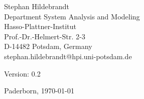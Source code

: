\documentclass[12pt,a4paper,twoside,titlepage,openright,headsepline,listof=totoc,index=totoc,chapterprefix,bibliography=totoc,noenddot,%
numbers=noenddot, %
]{scrreprt}
\theoremstyle{break}
\begin{document}
\begin{titlepage}
{            \vspace{1cm}

			Stephan Hildebrandt\\
			Department System Analysis and Modeling\\
			Hasso-Plattner-Institut\\
			Prof.-Dr.-Helmert-Str. 2-3\\
			D-14482 Potsdam, Germany\\
			stephan.hildebrandt@hpi.uni-potsdam.de\\

            \vspace{1.5cm}

            Version: 0.2

			\vspace{1.5cm}
			Paderborn, \today

		}
	\end{titlepage}


	
%
	
%	
        
% 	

% 	
	
	\tableofcontents
	\listoftodos
	\cleardoublepage
% 


	\setcounter{page}{1}

	 

	

	
	
		

	
	
	
	
        
	

	

\end{document}
